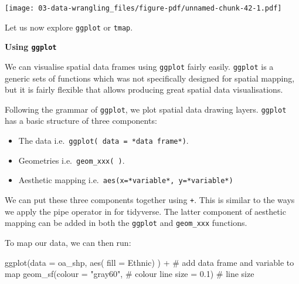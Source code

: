 \documentclass[
  letterpaper,
  DIV=11,
  numbers=noendperiod,
  oneside]{scrreprt}
\newenvironment{Shaded}{\begin{snugshade}}{\end{snugshade}}
\newcommand{\AttributeTok}[1]{\textcolor[rgb]{0.40,0.45,0.13}{#1}}
\newcommand{\CommentTok}[1]{\textcolor[rgb]{0.37,0.37,0.37}{#1}}
\newcommand{\FloatTok}[1]{\textcolor[rgb]{0.68,0.00,0.00}{#1}}
\newcommand{\FunctionTok}[1]{\textcolor[rgb]{0.28,0.35,0.67}{#1}}
\newcommand{\NormalTok}[1]{\textcolor[rgb]{0.00,0.23,0.31}{#1}}
\newcommand{\SpecialCharTok}[1]{\textcolor[rgb]{0.37,0.37,0.37}{#1}}
\newcommand{\StringTok}[1]{\textcolor[rgb]{0.13,0.47,0.30}{#1}}
\providecommand{\tightlist}{%
  \setlength{\itemsep}{0pt}\setlength{\parskip}{0pt}}\usepackage{longtable,booktabs,array}
\begin{document}
\texttt{[image: 03-data-wrangling\_files/figure-pdf/unnamed-chunk-42-1.pdf]}


Let us now explore \texttt{ggplot} or \texttt{tmap}.

\textbf{Using \texttt{ggplot}}

We can visualise spatial data frames using \texttt{ggplot} fairly
easily. \texttt{ggplot} is a generic sets of functions which was not
specifically designed for spatial mapping, but it is fairly flexible
that allows producing great spatial data visualisations.

Following the grammar of \texttt{ggplot}, we plot spatial data drawing
layers. \texttt{ggplot} has a basic structure of three components:

\begin{itemize}
\tightlist
\item
  The data i.e.~\texttt{ggplot(\ data\ =\ *data\ frame*)}.
\item
  Geometries i.e.~\texttt{geom\_xxx(\ )}.
\item
  Aesthetic mapping i.e.~\texttt{aes(x=*variable*,\ y=*variable*)}
\end{itemize}

We can put these three components together using \texttt{+}. This is
similar to the ways we apply the pipe operator in for tidyverse. The
latter component of aesthetic mapping can be added in both the
\texttt{ggplot} and \texttt{geom\_xxx} functions.

To map our data, we can then run:

\begin{Shaded}
\begin{Highlighting}[]
\FunctionTok{ggplot}\NormalTok{(}\AttributeTok{data =}\NormalTok{ oa\_shp, }\FunctionTok{aes}\NormalTok{( }\AttributeTok{fill =}\NormalTok{ Ethnic) ) }\SpecialCharTok{+} \CommentTok{\# add data frame and variable to map}
  \FunctionTok{geom\_sf}\NormalTok{(}\AttributeTok{colour =} \StringTok{"gray60"}\NormalTok{,  }\CommentTok{\# colour line}
          \AttributeTok{size =} \FloatTok{0.1}\NormalTok{) }\CommentTok{\# line size}
\end{Highlighting}
\end{Shaded}
\end{document}

